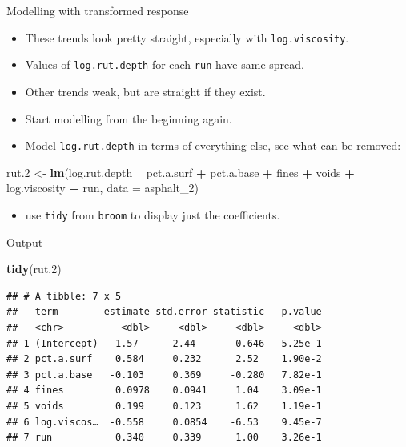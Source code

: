 \documentclass[ignorenonframetext,]{beamer}
\newenvironment{Shaded}{\begin{snugshade}}{\end{snugshade}}
\newcommand{\DataTypeTok}[1]{\textcolor[rgb]{0.13,0.29,0.53}{#1}}
\newcommand{\DecValTok}[1]{\textcolor[rgb]{0.00,0.00,0.81}{#1}}
\newcommand{\FloatTok}[1]{\textcolor[rgb]{0.00,0.00,0.81}{#1}}
\newcommand{\KeywordTok}[1]{\textcolor[rgb]{0.13,0.29,0.53}{\textbf{#1}}}
\newcommand{\NormalTok}[1]{#1}
\newcommand{\OperatorTok}[1]{\textcolor[rgb]{0.81,0.36,0.00}{\textbf{#1}}}
\newcommand{\StringTok}[1]{\textcolor[rgb]{0.31,0.60,0.02}{#1}}
\providecommand{\tightlist}{%
  \setlength{\itemsep}{0pt}\setlength{\parskip}{0pt}}
\begin{document}
\begin{frame}[fragile]{Modelling with transformed response}
\protect\hypertarget{modelling-with-transformed-response}{}

\begin{itemize}
\tightlist
\item
  These trends look pretty straight, especially with
  \texttt{log.viscosity}.
\item
  Values of \texttt{log.rut.depth} for each \texttt{run} have same
  spread.
\item
  Other trends weak, but are straight if they exist.
\item
  Start modelling from the beginning again.
\item
  Model \texttt{log.rut.depth} in terms of everything else, see what can
  be removed:
\end{itemize}

\begin{Shaded}
\begin{Highlighting}[]
\NormalTok{rut}\FloatTok{.2}\NormalTok{ <-}\StringTok{ }\KeywordTok{lm}\NormalTok{(log.rut.depth }\OperatorTok{~}\StringTok{ }\NormalTok{pct.a.surf }\OperatorTok{+}\StringTok{ }\NormalTok{pct.a.base }\OperatorTok{+}
\StringTok{  }\NormalTok{fines }\OperatorTok{+}\StringTok{ }\NormalTok{voids }\OperatorTok{+}\StringTok{ }\NormalTok{log.viscosity }\OperatorTok{+}\StringTok{ }\NormalTok{run, }\DataTypeTok{data =}\NormalTok{ asphalt_}\DecValTok{2}\NormalTok{)}
\end{Highlighting}
\end{Shaded}

\begin{itemize}
\tightlist
\item
  use \texttt{tidy} from \texttt{broom} to display just the
  coefficients.
\end{itemize}

\end{frame}

\begin{frame}[fragile]{Output}
\protect\hypertarget{output}{}

\begin{Shaded}
\begin{Highlighting}[]
\KeywordTok{tidy}\NormalTok{(rut}\FloatTok{.2}\NormalTok{)}
\end{Highlighting}
\end{Shaded}

\begin{verbatim}
## # A tibble: 7 x 5
##   term        estimate std.error statistic   p.value
##   <chr>          <dbl>     <dbl>     <dbl>     <dbl>
## 1 (Intercept)  -1.57      2.44      -0.646   5.25e-1
## 2 pct.a.surf    0.584     0.232      2.52    1.90e-2
## 3 pct.a.base   -0.103     0.369     -0.280   7.82e-1
## 4 fines         0.0978    0.0941     1.04    3.09e-1
## 5 voids         0.199     0.123      1.62    1.19e-1
## 6 log.viscos…  -0.558     0.0854    -6.53    9.45e-7
## 7 run           0.340     0.339      1.00    3.26e-1
\end{verbatim}

\end{frame}
\end{document}
